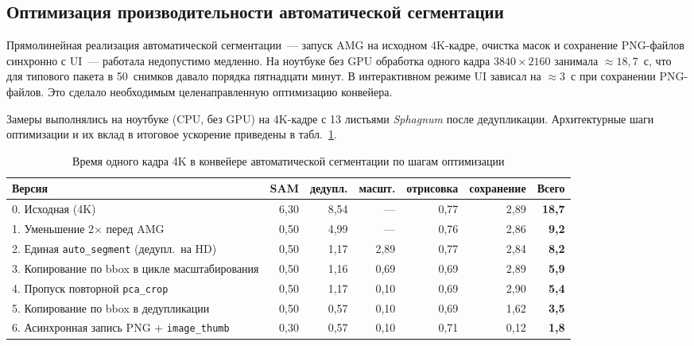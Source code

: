\subsection{Оптимизация производительности автоматической сегментации}
\label{sec:auto_perf}

Прямолинейная реализация автоматической сегментации~--- запуск AMG на исходном
4K-кадре, очистка масок и сохранение PNG-файлов синхронно с UI~--- работала
недопустимо медленно. На ноутбуке без GPU обработка одного кадра
$3840 \times 2160$ занимала $\approx 18{,}7$~с, что для типового пакета в
50~снимков давало порядка пятнадцати минут. В интерактивном режиме UI зависал
на $\approx 3$~с при сохранении PNG-файлов. Это сделало необходимым
целенаправленную оптимизацию конвейера.

Замеры выполнялись на ноутбуке (CPU, без GPU) на 4K-кадре с 13 листьями
\textit{Sphagnum} после дедупликации. Архитектурные шаги оптимизации и их
вклад в итоговое ускорение приведены в табл.~\ref{tab:auto_perf}.

\begin{table}[H]
\centering
\caption{Время одного кадра 4K в конвейере автоматической сегментации по шагам оптимизации}
\label{tab:auto_perf}
\small
\begin{tabular}{lrrrrrr}
\hline
\textbf{Версия} & \textbf{SAM} & \textbf{дедупл.} & \textbf{масшт.} & \textbf{отрисовка} & \textbf{сохранение} & \textbf{Всего} \\
\hline
0. Исходная (4K)                                  & 6{,}30 & 8{,}54 & ---    & 0{,}77 & 2{,}89 & \textbf{18{,}7} \\
1. Уменьшение 2$\times$ перед AMG                 & 0{,}50 & 4{,}99 & ---    & 0{,}76 & 2{,}86 & \textbf{9{,}2}  \\
2. Единая \texttt{auto\_segment} (дедупл.\ на HD) & 0{,}50 & 1{,}17 & 2{,}89 & 0{,}77 & 2{,}84 & \textbf{8{,}2}  \\
3. Копирование по bbox в цикле масштабирования    & 0{,}50 & 1{,}16 & 0{,}69 & 0{,}69 & 2{,}89 & \textbf{5{,}9}  \\
4. Пропуск повторной \texttt{pca\_crop}           & 0{,}50 & 1{,}17 & 0{,}10 & 0{,}69 & 2{,}90 & \textbf{5{,}4}  \\
5. Копирование по bbox в дедупликации             & 0{,}50 & 0{,}57 & 0{,}10 & 0{,}69 & 1{,}62 & \textbf{3{,}5}  \\
6. Асинхронная запись PNG + \texttt{image\_thumb} & 0{,}30 & 0{,}57 & 0{,}10 & 0{,}71 & 0{,}12 & \textbf{1{,}8}  \\
\hline
\end{tabular}
\end{table}

